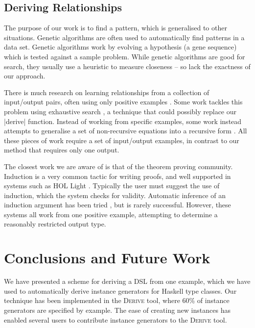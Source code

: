 \documentclass[preprint,draft]{sigplanconf}
\newcommand{\derive}{\textsc{Derive}}
\begin{document}
\subsection{Deriving Relationships}

The purpose of our work is to find a pattern, which is generalised to other situations. Genetic algorithms \cite{genetic_algorithms} are often used to automatically find patterns in a data set. Genetic algorithms work by evolving a hypothesis (a gene sequence) which is tested against a sample problem. While genetic algorithms are good for search, they usually use a heuristic to measure closeness -- so lack the exactness of our approach.

There is much research on learning relationships from a collection of input/output pairs, often using only positive examples \cite{kitzelmann:data_driven_induction_ground}. Some work tackles this problem using exhaustive search \cite{katayama:exhaustive_generation}, a technique that could possibly replace our |derive| function. Instead of working from specific examples, some work instead attempts to generalise a set of non-recursive equations into a recursive form \cite{kitzelmann:inductive_synthesis,kitzelmann:data_driven_induction}. All these pieces of work require a set of input/output examples, in contrast to our method that requires only one output.

The closest work we are aware of is that of the theorem proving community. Induction is a very common tactic for writing proofs, and well supported in systems such as HOL Light \cite{hol_light}. Typically the user must suggest the use of induction, which the system checks for validity. Automatic inference of an induction argument has been tried \cite{mintchev:reasoning}, but is rarely successful. However, these systems all work from one positive example, attempting to determine a reasonably restricted output type.

\section{Conclusions and Future Work}
\label{sec:conclusion}

We have presented a scheme for deriving a DSL from one example, which we have used to automatically derive instance generators for Haskell type classes. Our technique has been implemented in the \derive{} tool, where 60\% of instance generators are specified by example. The ease of creating new instances has enabled several users to contribute instance generators to the \derive{} tool.
\end{document}
